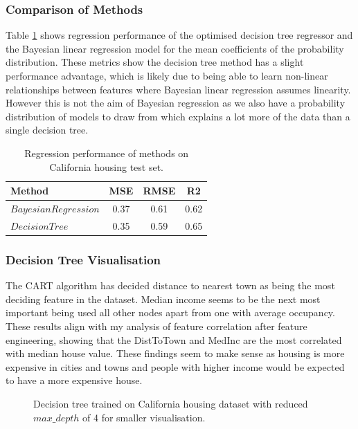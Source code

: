 \documentclass[11pt]{article}
\begin{document}
\subsubsection{Comparison of Methods}

Table \ref{04_regression_report} shows regression performance of the optimised decision tree regressor and the Bayesian linear regression model for the mean coefficients of the probability distribution. These metrics show the decision tree method has a slight performance advantage, which is likely due to being able to learn non-linear relationships between features where Bayesian linear regression assumes linearity. However this is not the aim of Bayesian regression as we also have a probability distribution of models to draw from which explains a lot more of the data than a single decision tree.

\begin{table}[h]
\begin{tabular}{|l||c|c|c|} 
     \hline
     Method & MSE & RMSE & R2 \\ [0.5ex] 
     \hline
     $Bayesian Regression$ & 0.37 & 0.61 & 0.62 \\ 
     $Decision Tree$       & 0.35 & 0.59 & 0.65  \\ [1ex] 
     \hline
\end{tabular}
\caption{Regression performance of methods on California housing test set.}
\label{04_regression_report}
\end{table}

\subsubsection{Decision Tree Visualisation}

The CART algorithm has decided distance to nearest town as being the most deciding feature in the dataset. Median income seems to be the next most important being used all other nodes apart from one with average occupancy. These results align with my analysis of feature correlation after feature engineering, showing that the DistToTown and MedInc are the most correlated with median house value. These findings seem to make sense as housing is more expensive in cities and towns and people with higher income would be expected to have a more expensive house.

\begin{figure}[h]
    \centering
    \caption{Decision tree trained on California housing dataset with reduced $max\_depth$ of 4 for smaller visualisation.}
\end{figure}
\end{document}
